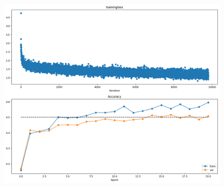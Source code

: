 \begin{itemize}[topsep=-13pt]
    \begin{figure}[!ht]
        \centering
        {{\includegraphics[scale = 0.32]{../nets/train_net/diagrams.png}}}  
    \end{figure}


\end{itemize}
